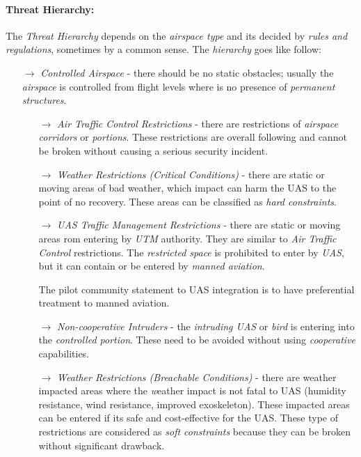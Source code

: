 \paragraph{Threat Hierarchy:} The \emph{Threat Hierarchy} depends on the \emph{airspace type} and its decided by \emph{rules and regulations}, sometimes by a common sense. The \emph{hierarchy} goes like follow:

\begin{itemize}
    \item[$\to$] \emph{Controlled Airspace} - there should be no static obstacles; usually the \emph{airspace} is controlled from flight levels where is no presence of \emph{permanent structures}.
        \begin{itemize}
            \item[$\to$] \emph{Air Traffic Control Restrictions} - there are restrictions of \emph{airspace corridors} or \emph{portions}. These restrictions are overall following and cannot be broken without causing a serious security incident.
            
            \item[$\to$] \emph{Weather Restrictions (Critical Conditions)} - there are static or moving areas of bad weather, which impact can harm the UAS to the point of no recovery. These areas can be classified as \emph{hard constraints}.  
            
            \item[$\to$] \emph{UAS Traffic Management Restrictions} - there are static or moving  areas rom entering by \emph{UTM} authority.  They are similar to \emph{Air Traffic Control} restrictions. The \emph{restricted space} is prohibited to enter by \emph{UAS}, but it can contain or be entered by \emph{manned aviation}.
            \begin{note}
                The pilot community statement to UAS integration is to have preferential treatment to manned aviation.
            \end{note}      
            
            
            \item[$\to$] \emph{Non-cooperative Intruders} - the \emph{intruding UAS} or \emph{bird} is entering into the \emph{controlled portion}. These need to be avoided without using \emph{cooperative} capabilities.
            
            \item[$\to$] \emph{Weather Restrictions (Breachable Conditions)} - there are weather impacted areas where the \emph weather impact is not fatal to UAS (humidity resistance, wind resistance, improved exoskeleton). These impacted areas can be entered if its safe and cost-effective for the UAS. These type of restrictions are considered as \emph{soft constraints} because they can be broken without significant drawback. 
        \end{itemize}
        

\end{itemize}
